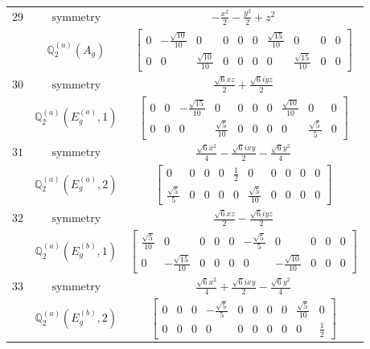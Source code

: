 \documentclass[fleqn,8pt,landscape]{jsarticle}
\begin{document}
\begin{longtable}{ccc}
$ 29 $ & $ \text{symmetry} $ & $ - \frac{x^{2}}{2} - \frac{y^{2}}{2} + z^{2} $ \\
$  $ & $ \mathbb{Q}_{2}^{(a)}(A_{g}) $ & $ \begin{bmatrix} 0 & - \frac{\sqrt{10}}{10} & 0 & 0 & 0 & 0 & \frac{\sqrt{15}}{10} & 0 & 0 & 0 \\ 0 & 0 & \frac{\sqrt{10}}{10} & 0 & 0 & 0 & 0 & \frac{\sqrt{15}}{10} & 0 & 0 \end{bmatrix} $ \\ \hline
$ 30 $ & $ \text{symmetry} $ & $ \frac{\sqrt{6} x z}{2} + \frac{\sqrt{6} i y z}{2} $ \\
$  $ & $ \mathbb{Q}_{2}^{(a)}(E_{g}^{(a)},1) $ & $ \begin{bmatrix} 0 & 0 & - \frac{\sqrt{15}}{10} & 0 & 0 & 0 & 0 & \frac{\sqrt{10}}{10} & 0 & 0 \\ 0 & 0 & 0 & \frac{\sqrt{5}}{10} & 0 & 0 & 0 & 0 & \frac{\sqrt{5}}{5} & 0 \end{bmatrix} $ \\ \hline
$ 31 $ & $ \text{symmetry} $ & $ \frac{\sqrt{6} x^{2}}{4} - \frac{\sqrt{6} i x y}{2} - \frac{\sqrt{6} y^{2}}{4} $ \\
$  $ & $ \mathbb{Q}_{2}^{(a)}(E_{g}^{(a)},2) $ & $ \begin{bmatrix} 0 & 0 & 0 & 0 & \frac{1}{2} & 0 & 0 & 0 & 0 & 0 \\ \frac{\sqrt{5}}{5} & 0 & 0 & 0 & 0 & \frac{\sqrt{5}}{10} & 0 & 0 & 0 & 0 \end{bmatrix} $ \\ \hline
$ 32 $ & $ \text{symmetry} $ & $ \frac{\sqrt{6} x z}{2} - \frac{\sqrt{6} i y z}{2} $ \\
$  $ & $ \mathbb{Q}_{2}^{(a)}(E_{g}^{(b)},1) $ & $ \begin{bmatrix} \frac{\sqrt{5}}{10} & 0 & 0 & 0 & 0 & - \frac{\sqrt{5}}{5} & 0 & 0 & 0 & 0 \\ 0 & - \frac{\sqrt{15}}{10} & 0 & 0 & 0 & 0 & - \frac{\sqrt{10}}{10} & 0 & 0 & 0 \end{bmatrix} $ \\ \hline
$ 33 $ & $ \text{symmetry} $ & $ \frac{\sqrt{6} x^{2}}{4} + \frac{\sqrt{6} i x y}{2} - \frac{\sqrt{6} y^{2}}{4} $ \\
$  $ & $ \mathbb{Q}_{2}^{(a)}(E_{g}^{(b)},2) $ & $ \begin{bmatrix} 0 & 0 & 0 & - \frac{\sqrt{5}}{5} & 0 & 0 & 0 & 0 & \frac{\sqrt{5}}{10} & 0 \\ 0 & 0 & 0 & 0 & 0 & 0 & 0 & 0 & 0 & \frac{1}{2} \end{bmatrix} $ \\ \hline

\end{longtable}
\end{document}
